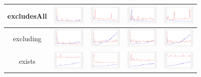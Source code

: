 \begin{longtable}{ c|c c c c}
excludesAll
&
\includegraphics[width=1.6cm]{../graphs/sequence/small/ExcludesAll}
&
\includegraphics[width=1.6cm]{../graphs/set/small/ExcludesAll}
&
\includegraphics[width=1.6cm]{../graphs/bag/small/ExcludesAll}
&
\includegraphics[width=1.6cm]{../graphs/orderedset/small/ExcludesAll}
\\\hline

excluding
&
\includegraphics[width=1.6cm]{../graphs/sequence/small/Excluding}
&
\includegraphics[width=1.6cm]{../graphs/set/small/Excluding}
&
\includegraphics[width=1.6cm]{../graphs/bag/small/Excluding}
&
\includegraphics[width=1.6cm]{../graphs/orderedset/small/Excluding}
\\\hline

exists
&
\includegraphics[width=1.6cm]{../graphs/sequence/small/Exists}
&
\includegraphics[width=1.6cm]{../graphs/set/small/Exists}
&
\includegraphics[width=1.6cm]{../graphs/bag/small/Exists}
&
\includegraphics[width=1.6cm]{../graphs/orderedset/small/Exists}
\\\hline


\end{longtable}
